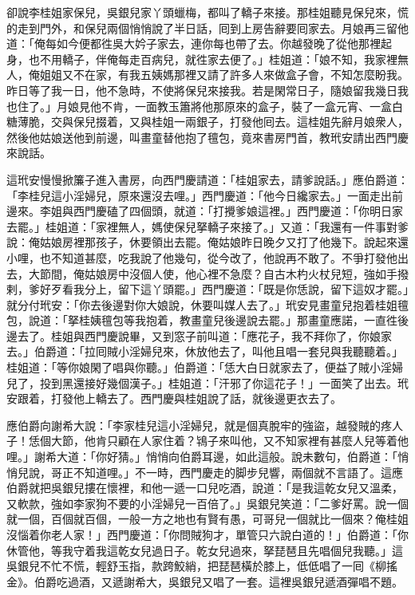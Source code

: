 卻說李桂姐家保兒，吳銀兒家丫頭蠟梅，都叫了轎子來接。那桂姐聽見保兒來，慌的走到門外，和保兒兩個悄悄說了半日話，囘到上房告辭要囘家去。月娘再三留他道：「俺每如今便都徃吳大妗子家去，連你每也帶了去。你越發晚了從他那裡起身，也不用轎子，伴俺每走百病兒，就徃家去便了。」桂姐道：「娘不知，我家裡無人，俺姐姐又不在家，有我五姨媽那裡又請了許多人來做盒子會，不知怎麼盼我。昨日等了我一日，他不急時，不使將保兒來接我。若是閑常日子，隨娘留我幾日我也住了。」月娘見他不肯，一面教玉簫將他那原來的盒子，裝了一盒元宵、一盒白糖薄脆，交與保兒掇着，又與桂姐一兩銀子，打發他囘去。這桂姐先辭月娘衆人，然後他姑娘送他到前邊，叫畫童替他抱了氊包，竟來書房門首，教玳安請出西門慶來說話。

這玳安慢慢掀簾子進入書房，向西門慶請道：「桂姐家去，請爹說話。」應伯爵道：「李桂兒這小淫婦兒，原來還沒去哩。」西門慶道：「他今日纔家去。」一面走出前邊來。李姐與西門慶磕了四個頭，就道：「打攪爹娘這裡。」西門慶道：「你明日家去罷。」桂姐道：「家裡無人，媽使保兒拏轎子來接了。」又道：「我還有一件事對爹說：俺姑娘房裡那孩子，休要領出去罷。俺姑娘昨日晚夕又打了他幾下。說起來還小哩，也不知道甚麼，吃我說了他幾句，從今改了，他說再不敢了。不爭打發他出去，大節間，俺姑娘房中沒個人使，他心裡不急麼？自古木杓火杖兒短，強如手撥剌，爹好歹看我分上，留下這丫頭罷。」西門慶道：「既是你恁說，留下這奴才罷。」就分付玳安：「你去後邊對你大娘說，休要叫媒人去了。」玳安見畫童兒抱着桂姐氊包，說道：「拏桂姨氊包等我抱着，教畫童兒後邊說去罷。」那畫童應諾，一直徃後邊去了。桂姐與西門慶說畢，又到窓子前叫道：「應花子，我不拜你了，你娘家去。」伯爵道：「拉囘賊小淫婦兒來，休放他去了，叫他且唱一套兒與我聽聽着。」桂姐道：「等你娘閑了唱與你聽。」伯爵道：「恁大白日就家去了，便益了賊小淫婦兒了，投到黑還接好幾個漢子。」桂姐道：「汗邪了你這花子！」一面笑了出去。玳安跟着，打發他上轎去了。西門慶與桂姐說了話，就後邊更衣去了。

應伯爵向謝希大說：「李家桂兒這小淫婦兒，就是個真脫牢的強盜，越發賊的疼人子！恁個大節，他肯只顧在人家住着？鴇子來叫他，又不知家裡有甚麼人兒等着他哩。」謝希大道：「你好猜。」悄悄向伯爵耳邊，如此這般。說未數句，伯爵道：「悄悄兒說，哥正不知道哩。」{}不一時，西門慶走的脚步兒響，兩個就不言語了。這應伯爵就把吳銀兒摟在懷裡，和他一遞一口兒吃酒，說道：「是我這乾女兒又溫柔，又軟款，強如李家狗不要的小淫婦兒一百倍了。」吳銀兒笑道：「二爹好罵。說一個就一個，百個就百個，一般一方之地也有賢有愚，可哥兒一個就比一個來？俺桂姐沒惱着你老人家！」西門慶道：「你問賊狗才，單管只六說白道的！」伯爵道：「你休管他，等我守着我這乾女兒過日子。乾女兒過來，拏琵琶且先唱個兒我聽。」這吳銀兒不忙不慌，輕舒玉指，款跨鮫綃，把琵琶橫於膝上，低低唱了一囘《柳搖金》。伯爵吃過酒，又遞謝希大，吳銀兒又唱了一套。這裡吳銀兒遞酒彈唱不題。

